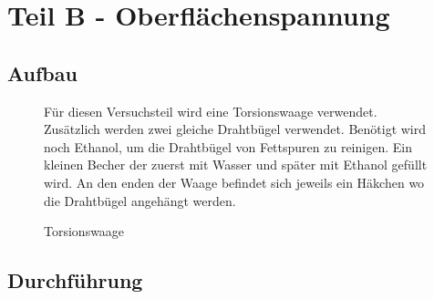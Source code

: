 \documentclass[11pt,a4paper]{article}
\begin{document}
\section{Teil B - Oberfl\"achenspannung}

\subsection{Aufbau}

\begin{figure}[h]
\begin{minipage}{.6\textwidth}
Für diesen Versuchsteil wird eine Torsionswaage verwendet. Zusätzlich werden zwei gleiche Drahtbügel verwendet. Benötigt wird noch Ethanol, um die Drahtbügel von Fettspuren zu reinigen. Ein kleinen Becher der zuerst mit Wasser und später mit Ethanol gefüllt wird. An den enden der Waage befindet sich jeweils ein Häkchen wo die Drahtbügel angehängt werden. 
\end{minipage}%
\begin{minipage}{.4\textwidth}
\centering
{}
   \renewcommand\thefigure{B2}
\caption[Torsionswaage]{Torsionswaage \cite{Anleitung}}
\label{NS1}
\end{minipage}
\end{figure}

\subsection{Durchführung}
\end{document}
